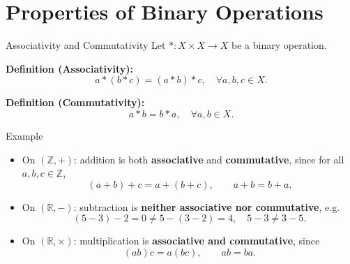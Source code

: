 \documentclass[11pt,aspectratio=43,ignorenonframetext,t]{beamer}
\begin{document}
\section{Properties of Binary Operations}

\begin{frame}{Associativity and Commutativity}
\vspace{-0.3cm}
Let \( *: X\times X \to X \) be a binary operation.

\textbf{Definition (Associativity):}
\[
a * (b * c) = (a * b) * c, \quad \forall a,b,c \in X.
\]

\textbf{Definition (Commutativity):}
\[
a * b = b * a, \quad \forall a,b \in X.
\]

\begin{center}
\end{center}
\end{frame}

\begin{frame}{Example}

\begin{block}{}
    \begin{itemize}
  \item On \((\mathbb{Z}, +)\): addition is both \textbf{associative} and \textbf{commutative}, since for all \(a,b,c \in \mathbb{Z}\),
  \[
  (a+b)+c = a+(b+c), \qquad a+b = b+a.
  \]
  \item On \((\mathbb{R}, -)\): subtraction is \textbf{neither associative nor commutative}, e.g.
  \[
  (5-3)-2 = 0 \neq 5-(3-2)=4, \quad 5-3 \neq 3-5.
  \]
  \item On \((\mathbb{R}, \times)\): multiplication is \textbf{associative and commutative}, since
  \[
  (a b)c = a(b c), \qquad a b = b a.
  \]
\end{itemize}
\end{block}
\end{frame}
\end{document}
